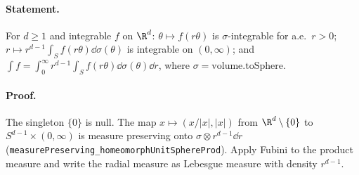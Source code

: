 \paragraph{Statement.} For $d\geq1$ and integrable $f$ on $\R^d$: $\theta\mapsto f(r\theta)$ is
$\sigma$-integrable for a.e.\ $r>0$; $r\mapsto r^{d-1}\int_Sf(r\theta)\dd\sigma(\theta)$ is integrable on
$(0,\infty)$; and $\int f=\int_0^\infty r^{d-1}\int_Sf(r\theta)\dd\sigma(\theta)\dd r$, where
$\sigma=\mathrm{volume.toSphere}$.
\paragraph{Proof.} The singleton $\{0\}$ is null. The map $x\mapsto(x/|x|,|x|)$ from $\R^d\setminus\{0\}$ to
$S^{d-1}\times(0,\infty)$ is measure preserving onto $\sigma\otimes r^{d-1}\dd r$
(\texttt{measurePreserving\_homeomorphUnitSphereProd}). Apply Fubini to the product measure and write the
radial measure as Lebesgue measure with density $r^{d-1}$.
